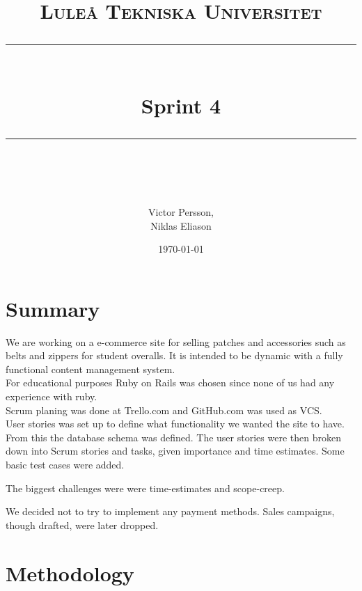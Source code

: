 \documentclass[paper=a4, fontsize=11pt]{report} %
\newcommand{\horrule}[1]{\rule{\linewidth}{#1}}       %
\begin{document}
%
\title{
	\normalfont \normalsize
	\textsc{Luleå Tekniska Universitet} \\ [25pt] %
	\horrule{1pt} \\[0.4cm]                       %
	\huge Sprint 4 \\                             %
	\horrule{1pt} \\[0.5cm]                       %
}
%
\author{Victor Persson,\\ Niklas Eliason}             %
%
\date{\normalsize\today}                              %
%
\maketitle                                            %
%
\tableofcontents
\thispagestyle{empty}
\sectionfont{\scshape}
%
\newpage
\setcounter{page}{1}


\section*{Summary}
	We are working on a e-commerce site for selling patches and accessories such as
	belts and zippers for student overalls. It is intended to be dynamic with a
	fully functional content management system. \\
	For educational purposes Ruby on Rails was chosen since none of us had any
    experience with ruby. \\
	Scrum planing was done at Trello.com and GitHub.com was used as VCS. \\

	User stories was set up to define what functionality we wanted the site
	to have. From this the database schema was defined. The user
	stories were then broken down into Scrum stories and tasks, given importance
	and time estimates. Some basic test cases were added.

	The biggest challenges were were time-estimates and scope-creep.

	We decided not to try to implement any payment methods. Sales campaigns,
	though drafted, were later dropped.

\section*{Methodology}
\end{document}
